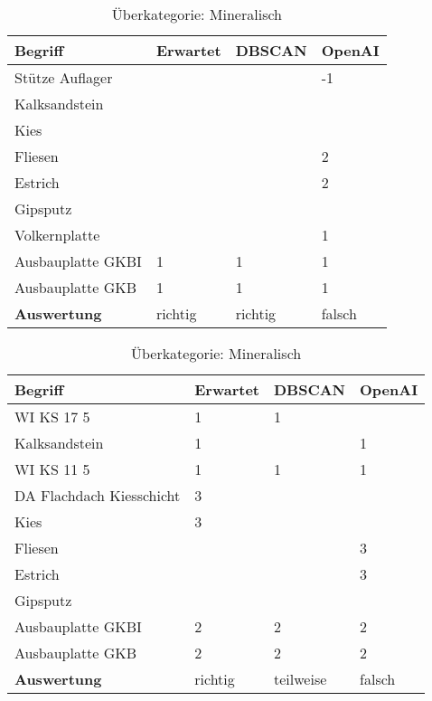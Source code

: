 \begin{table}[h]
	
	\centering
	\begin{tabular}{|l|l|l|l|}
		\hline
		\textbf{Begriff} & \textbf{Erwartet} & \textbf{DBSCAN} & \textbf{OpenAI}\\ \hline
		 Stütze Auflager & ~ & ~ & -1 \\ \hline
		Kalksandstein & ~ & ~ & ~ \\ \hline
		Kies & ~ & ~ & ~ \\ \hline
		Fliesen & ~ & ~ & 2 \\ \hline
		Estrich & ~ & ~ & 2 \\ \hline
		Gipsputz & ~ & ~ & ~ \\ \hline
		Volkernplatte & ~ & ~ & 1 \\ \hline
		Ausbauplatte GKBI & 1 & 1 & 1 \\ \hline
		Ausbauplatte GKB & 1 & 1 & 1 \\ \hline
		\textbf{Auswertung} & richtig & richtig & falsch \\ \hline
	\end{tabular}
	\caption{Überkategorie: Mineralisch}
	\label{t:evaluation-example4}
\end{table}

\begin{table}[h]
	
	\centering
	\begin{tabular}{|l|l|l|l|}
		\hline
		\textbf{Begriff} & \textbf{Erwartet} & \textbf{DBSCAN} & \textbf{OpenAI}\\ \hline
		 WI KS 17 5 & 1 & 1 & ~ \\ \hline
		Kalksandstein & 1 & ~ & 1 \\ \hline
		WI KS 11 5 & 1 & 1 & 1 \\ \hline
		DA Flachdach Kiesschicht & 3 & ~ & ~ \\ \hline
		Kies & 3 & ~ & ~ \\ \hline
		Fliesen & ~ & ~ & 3 \\ \hline
		Estrich & ~ & ~ & 3 \\ \hline
		Gipsputz & ~ & ~ & ~ \\ \hline
		Ausbauplatte GKBI & 2 & 2 & 2 \\ \hline
		Ausbauplatte GKB & 2 & 2 & 2 \\ \hline
		\textbf{Auswertung} & richtig & teilweise & falsch \\ \hline
	\end{tabular}
	\caption{Überkategorie: Mineralisch}
	\label{t:evaluation-example5}
\end{table}


